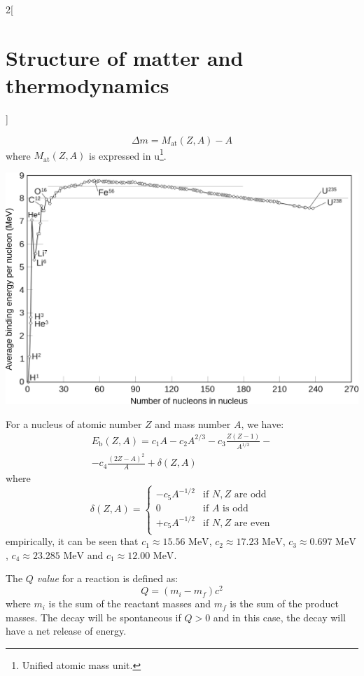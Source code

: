 \documentclass[../../../main.tex]{subfiles}
\begin{document}
\begin{multicols}{2}[\section{Structure of matter and thermodynamics}]
\begin{proposition}
    $$\Delta m=M_\text{at}(Z,A)-A$$ where $M_\text{at}(Z,A)$ is expressed in u\footnote{Unified atomic mass unit.}.
  \end{proposition}
  \begin{center}
    \begin{minipage}{\linewidth}
      \centering
      \includegraphics[width=\linewidth]{Images/Binding_energy.png}
    \end{minipage}
  \end{center}
  \begin{proposition}
    For a nucleus of atomic number $Z$ and mass number $A$, we have:
    \begin{multline*}
      E_\text{b}(Z,A)=c_1A-c_2A^{2/3}-c_3\frac{Z(Z-1)}{A^{1/3}}-\\-c_4\frac{{(2Z-A)}^2}{A}+\delta(Z,A)
    \end{multline*}
    where
    $$\delta(Z,A)=
      \begin{cases}
        -c_5A^{-1/2} & \text{if }N, Z\text{ are odd}  \\
        0            & \text{if }A\text{ is odd}      \\
        +c_5A^{-1/2} & \text{if }N, Z\text{ are even} \\
      \end{cases}
    $$
    empirically, it can be seen that $c_1\approx 15.56\text{ MeV}$, $c_2\approx 17.23\text{ MeV}$, $c_3\approx 0.697\text{ MeV}$, $c_4\approx 23.285\text{ MeV}$ and $c_1\approx 12.00\text{ MeV}$.
  \end{proposition}
  \begin{definition}[Q value]
    The \emph{$Q$ value} for a reaction is defined as: $$Q=(m_i-m_f)c^2$$ where $m_i$ is the sum of the reactant masses and $m_f$ is the sum of the product masses. The decay will be spontaneous if $Q>0$ and in this case, the decay will have a net release of energy.

\end{definition}
\end{multicols}
\end{document}
